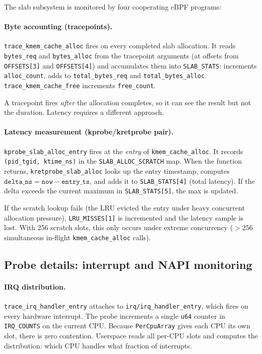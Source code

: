 \documentclass[11pt]{article}
\begin{document}
The slab subsystem is monitored by four cooperating eBPF programs:

\paragraph{Byte accounting (tracepoints).}
\texttt{trace\_kmem\_cache\_alloc} fires on every completed slab allocation.
It reads \texttt{bytes\_req} and \texttt{bytes\_alloc} from the tracepoint
arguments (at offsets from \texttt{OFFSETS[3]} and \texttt{OFFSETS[4]}) and
accumulates them into \texttt{SLAB\_STATS}: increments \texttt{alloc\_count},
adds to \texttt{total\_bytes\_req} and \texttt{total\_bytes\_alloc}.
\texttt{trace\_kmem\_cache\_free} increments \texttt{free\_count}.

A tracepoint fires \emph{after} the allocation completes, so it can see
the result but not the duration. Latency requires a different approach.

\paragraph{Latency measurement (kprobe/kretprobe pair).}
\texttt{kprobe\_slab\_alloc\_entry} fires at the \emph{entry} of
\texttt{kmem\_cache\_alloc}. It records \texttt{(pid\_tgid, ktime\_ns)} in
the \texttt{SLAB\_ALLOC\_SCRATCH} map. When the function returns,
\texttt{kretprobe\_slab\_alloc} looks up the entry timestamp, computes
$\texttt{delta\_ns} = \texttt{now} - \texttt{entry\_ts}$, and adds it to
\texttt{SLAB\_STATS[4]} (total latency). If the delta exceeds the current
maximum in \texttt{SLAB\_STATS[5]}, the max is updated.

If the scratch lookup fails (the LRU evicted the entry under heavy
concurrent allocation pressure), \texttt{LRU\_MISSES[1]} is incremented
and the latency sample is lost. With 256 scratch slots, this only occurs
under extreme concurrency ($>256$ simultaneous in-flight
\texttt{kmem\_cache\_alloc} calls).

\subsection{Probe details: interrupt and NAPI monitoring}

\paragraph{IRQ distribution.}
\texttt{trace\_irq\_handler\_entry} attaches to \texttt{irq/irq\_handler\_entry},
which fires on every hardware interrupt. The probe increments a single
\texttt{u64} counter in \texttt{IRQ\_COUNTS} on the current CPU. Because
\texttt{PerCpuArray} gives each CPU its own slot, there is zero contention.
Userspace reads all per-CPU slots and computes the distribution: which CPU
handles what fraction of interrupts.
\end{document}

